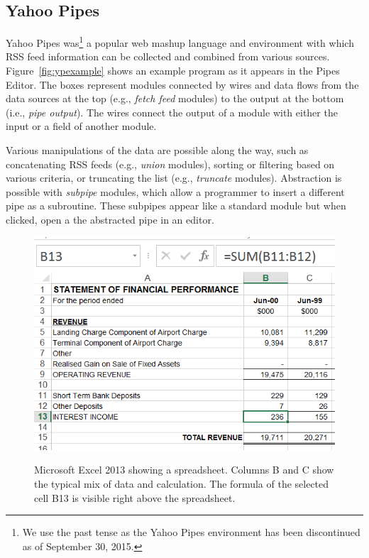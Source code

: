 \documentclass{sig-alternate}
\begin{document}
\subsection{Yahoo Pipes}
Yahoo Pipes was\footnote{We use the past tense as the Yahoo Pipes environment has been discontinued as of September 30, 2015.} a popular web mashup language and environment with which RSS feed information can be collected and combined from various sources.  Figure~\ref{fig:ypexample} shows an example program as it appears in the Pipes Editor. The boxes represent modules connected by wires and data flows from the data sources at the top  (e.g., \emph{fetch feed} modules) to the output at the bottom (i.e., \emph{pipe output}). The wires connect the output of a module with either the input or a field of another module. 

Various manipulations of the data are possible along the  way, such as concatenating RSS feeds (e.g., \emph{union} modules), sorting  or filtering based on various criteria, or truncating the list (e.g., \emph{truncate} modules). 
Abstraction is possible with \emph{subpipe} modules, which allow a programmer to insert a different pipe as a subroutine. These subpipes appear like a standard module but when clicked, open a the abstracted pipe in an editor. 

\begin{figure}
\caption{Microsoft Excel 2013 showing a spreadsheet. Columns B and C show the typical mix of data and calculation. The formula of the selected cell B13 is visible right above the spreadsheet.}
\centering
\includegraphics[width=\columnwidth]{img/excel-2}
\label{fig:spreadsheetexample}
\end{figure}
\end{document}
